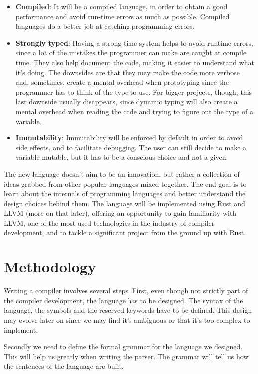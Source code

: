 ﻿\documentclass[10pt,a4paper,twocolumn,twoside]{article}
\begin{document}
\begin{itemize}
     \item \textbf{Compiled}: It will be a compiled language, in order to obtain
         a good performance and avoid run-time errors as much as possible.
         Compiled languages do a better job at catching programming errors.
     \item \textbf{Strongly typed}: Having a strong time system helps to avoid
         runtime errors, since a lot of the mistakes the programmer can make are
         caught at compile time. They also help document the code, making it
         easier to understand what it's doing. The downsides are that they may
         make the code more verbose and, sometimes, create a mental overhead
         when prototyping since the programmer has to think of the type to use.
         For bigger projects, though, this last downside usually disappears,
         since dynamic typing will also create a mental overhead when reading
         the code and trying to figure out the type of a variable.
     \item \textbf{Immutability}: Immutability will be enforced by default in 
         order to avoid side effects, and to facilitate debugging. The user can
         still decide to make a variable mutable, but it has to be a conscious
         choice and not a given.
\end{itemize}

The new language doesn't aim to be an innovation, but rather a collection of
ideas grabbed from other popular languages mixed together. The end goal is to
learn about the internals of programming languages and better understand the
design choices behind them. The language will be implemented using Rust and LLVM
(more on that later), offering an opportunity to gain familiarity with LLVM, one
of the most used technologies in the industry of compiler development, and to
tackle a significant project from the ground up with Rust.

\section{Methodology}
Writing a compiler involves several steps. First, even though not strictly part
of the compiler development, the language has to be designed. The syntax of the
language, the symbols and the reserved keywords have to be defined. This design
may evolve later on since we may find it's ambiguous or that it's too complex to
implement.

Secondly we need to define the formal grammar for the language we designed. This
will help us greatly when writing the parser. The grammar will tell us how the
sentences of the language are built.
\end{document}
